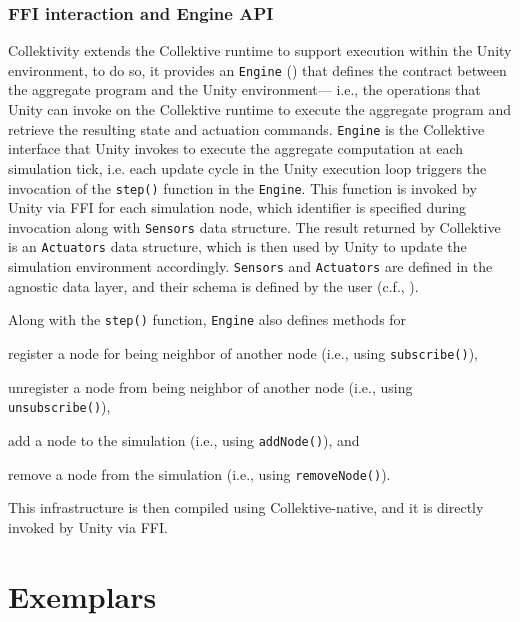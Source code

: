 \documentclass[runningheads]{llncs}
\newenvironment{inlinelist}{\begin{enumerate*}[label=\emph{(\roman*)}]}{\end{enumerate*}}
\begin{document}
\subsubsection{\ac{FFI} interaction and Engine API}

Collektivity extends the Collektive runtime to support execution within the Unity environment,
to do so, it provides an \texttt{Engine} ()
that defines the contract between the aggregate program and the Unity environment---%
i.e., the operations that Unity can invoke on the Collektive runtime to execute the aggregate program and retrieve the resulting state and actuation commands.
%
\texttt{Engine} is the Collektive interface that Unity invokes to execute the aggregate computation at each simulation tick,
i.e. each update cycle in the Unity execution loop triggers the invocation 
of the \texttt{step()} function in the \texttt{Engine}.
%
This function is invoked by Unity via \ac{FFI} for each simulation node, 
which identifier is specified during invocation along with \texttt{Sensors} data structure.
%
The result returned by Collektive is an \texttt{Actuators} data structure,
which is then used by Unity to update the simulation environment accordingly.
%
\texttt{Sensors} and \texttt{Actuators} are defined in the agnostic data layer,
and their schema is defined by the user (c.f., ).



Along with the \texttt{step()} function,
\texttt{Engine} also defines methods for
\begin{inlinelist}
    \item register a node for being neighbor of another node (i.e., using \texttt{subscribe()}), 
    \item unregister a node from being neighbor of another node (i.e., using \texttt{unsubscribe()}),
    \item add a node to the simulation (i.e., using \texttt{addNode()}), and
    \item remove a node from the simulation (i.e., using \texttt{removeNode()}).  
\end{inlinelist}
%
This infrastructure is then compiled using Collektive-native,
and it is directly invoked by Unity via \ac{FFI}.

\section{Exemplars}\label{sec:case-study}
\end{document}
